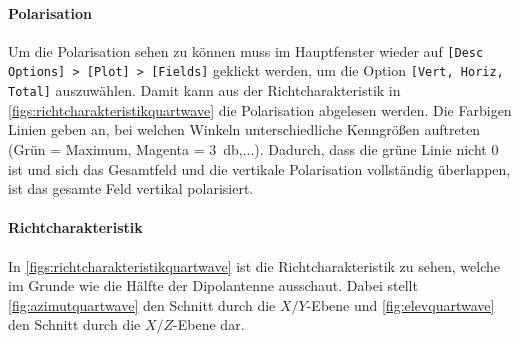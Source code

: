 \documentclass[colorlinks = true, allcolors = black, ngerman, 11pt,
a4paper, twoside, titlepage]{article}
\numberwithin{figure}{section}
\renewcommand{\si}[2]{\SI{#1}{#2}}
\begin{document}
	\paragraph{Polarisation}
	Um die Polarisation sehen zu können muss im Hauptfenster wieder auf \texttt{[Desc Options] > [Plot] > [Fields]} geklickt werden, um die Option \texttt{[Vert, Horiz, Total]} auszuwählen. Damit kann aus der Richtcharakteristik in \cref{figs:richtcharakteristikquartwave} die Polarisation abgelesen werden. Die Farbigen Linien geben an, bei welchen Winkeln unterschiedliche Kenngrößen auftreten (Grün = Maximum, Magenta = \si{3}{\decibel},...). Dadurch, dass die grüne Linie nicht $0$ ist und sich das Gesamtfeld und die vertikale Polarisation vollständig überlappen, ist das gesamte Feld vertikal polarisiert.
	
	\paragraph{Richtcharakteristik}
	In \cref{figs:richtcharakteristikquartwave} ist die Richtcharakteristik zu sehen, welche im Grunde wie die Hälfte der Dipolantenne ausschaut. Dabei stellt \cref{fig:azimutquartwave} den Schnitt durch die $X/Y$-Ebene und \cref{fig:elevquartwave} den Schnitt durch die $X/Z$-Ebene dar.
\end{document}
